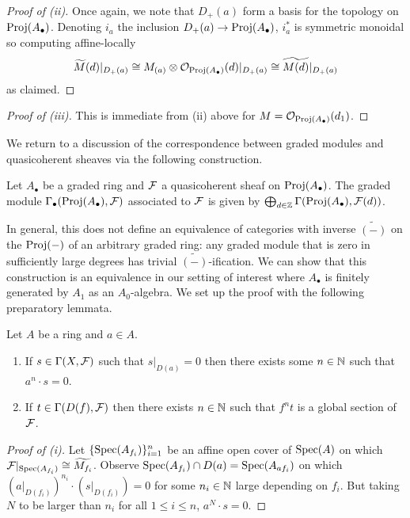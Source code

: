 \begin{proof}[Proof of (ii)]
    Once again, we note that $D_{+}(a)$ form a basis for the topology on $\operatorname{Proj}(A_{\bullet})$. Denoting $i_{a}$ the inclusion $D_{+}(a)\to\operatorname{Proj}(A_{\bullet})$, $i_{a}^{*}$ is symmetric monoidal so computing affine-locally
    $$\widetilde{M}(d)|_{D_{+}(a)}\cong M_{(a)}\otimes\mathcal{O}_{\operatorname{Proj}(A_{\bullet})}(d)|_{D_{+}(a)}\cong \widetilde{M(d)}|_{D_{+}(a)}$$
    as claimed. 
\end{proof}
\begin{proof}[Proof of (iii)]
    This is immediate from (ii) above for $M=\mathcal{O}_{\operatorname{Proj}(A_{\bullet})}(d_{1})$. 
\end{proof}
We return to a discussion of the correspondence between graded modules and quasicoherent sheaves via the following construction. 
\begin{definition}\label{def: graded module of quasicoherent sheaf}
    Let $A_{\bullet}$ be a graded ring and $\mathcal{F}$ a quasicoherent sheaf on $\operatorname{Proj}(A_{\bullet})$. The graded module $\Gamma_{\bullet}(\operatorname{Proj}(A_{\bullet}),\mathcal{F})$ associated to $\mathcal{F}$ is given by $\bigoplus_{d\in\mathbb{Z}}\Gamma(\operatorname{Proj}(A_{\bullet}),\mathcal{F}(d))$. 
\end{definition}
In general, this does not define an equivalence of categories with inverse $\widetilde{(-)}$ on the $\operatorname{Proj}(-)$ of an arbitrary graded ring: any graded module that is zero in sufficiently large degrees has trivial $\widetilde{(-)}$-ification. We can show that this construction is an equivalence in our setting of interest where $A_{\bullet}$ is finitely generated by $A_{1}$ as an $A_{0}$-algebra. We set up the proof with the following preparatory lemmata. 
\begin{lemma}\label{lem: sections of module sheaf over distinguished opens}
    Let $A$ be a ring and $a\in A$. 
    \begin{enumerate}[label=(\alph*)]
        \item If $s\in\Gamma(X,\mathcal{F})$ such that $s|_{D(a)}=0$ then there exists some $n\in\mathbb{N}$ such that $a^{n}\cdot s=0$. 
        \item If $t\in\Gamma(D(f),\mathcal{F})$ then there exists $n\in\mathbb{N}$ such that $f^{n}t$ is a global section of $\mathcal{F}$. 
    \end{enumerate}
\end{lemma}
\begin{proof}[Proof of (i)]
    Let $\{\operatorname{Spec}(A_{f_{i}})\}_{i=1}^{n}$ be an affine open cover of $\operatorname{Spec}(A)$ on which $\mathcal{F}|_{\operatorname{Spec}(A_{f_{i}})}\cong\widetilde{M_{f_{i}}}$. Observe $\operatorname{Spec}(A_{f_{i}})\cap D(a)=\operatorname{Spec}(A_{af_{i}})$ on which $(a|_{D(f_{i})})^{n_{i}}\cdot(s|_{D(f_{i})})=0$ for some $n_{i}\in\mathbb{N}$ large depending on $f_{i}$. But taking $N$ to be larger than $n_{i}$ for all $1\leq i\leq n$, $a^{N}\cdot s=0$. 
\end{proof}
